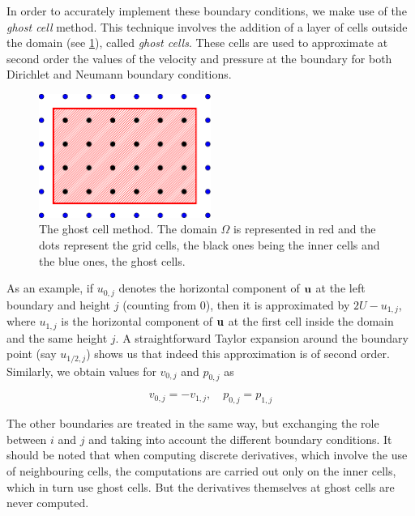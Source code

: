 In order to accurately implement these boundary conditions, we make use of the \textit{ghost cell} method. This technique involves the addition of a layer of cells outside the domain (see \cref{fig: ghostCells}), called \textit{ghost cells}. These cells are used to approximate at second order the values of the velocity and pressure at the boundary for both Dirichlet and Neumann boundary conditions.

\begin{figure}[h]
  \centering
  \includegraphics[width=0.5\textwidth]{0_graphics/methods/grid.pdf}
  \caption{The ghost cell method. The domain $\Omega$ is represented in red and the dots represent the grid cells, the black ones being the inner cells and the blue ones, the ghost cells.}
  \label{fig: ghostCells}
\end{figure}

As an example, if $u_{0,j}$ denotes the horizontal component of $\boldsymbol{\mathrm{u}}$ at the left boundary and height $j$ (counting from 0), then it is approximated by $2U-u_{1,j}$, where $u_{1,j}$ is the horizontal component of $\boldsymbol{\mathrm{u}}$ at the first cell inside the domain and the same height $j$. A straightforward Taylor expansion around the boundary point (say $u_{1/2,j}$) shows us that indeed this approximation is of second order. Similarly, we obtain values for $v_{0,j}$ and $p_{0,j}$ as

$$
  v_{0,j} = -v_{1,j}, \quad p_{0,j} = p_{1,j}
$$

The other boundaries are treated in the same way, but exchanging the role between $i$ and $j$ and taking into account the different boundary conditions. It should be noted that when computing discrete derivatives, which involve the use of neighbouring cells, the computations are carried out only on the inner cells, which in turn use ghost cells. But the derivatives themselves at ghost cells are never computed.

